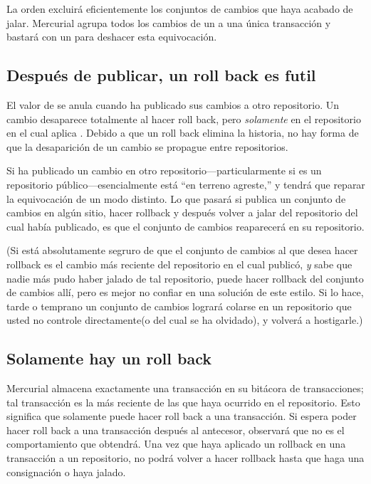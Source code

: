 La orden  excluirá eficientemente los conjuntos de
cambios que haya acabado de jalar.  Mercurial agrupa todos los cambios
de un  a una única transacción y bastará con un
 para deshacer esta equivocación.

\subsection{Después de publicar, un roll back es futil}
\label{sec:undo:rollback-after-push}

El valor de  se anula cuando ha publicado sus cambios
a otro repositorio.  Un cambio desaparece totalmente al hacer roll back,
pero \emph{solamente} en el repositorio en el cual aplica
.  Debido a que un roll back elimina la historia,
no hay forma de que la desaparición de un cambio se propague entre
repositorios.

Si ha publicado un cambio en otro repositorio---particularmente si es
un repositorio público---esencialmente está ``en terreno agreste,''
y tendrá que reparar la equivocación de un modo distinto.  Lo que
pasará si publica un conjunto de cambios en algún sitio, hacer
rollback y después volver a jalar del repositorio del cual había
publicado, es que el conjunto de cambios reaparecerá en su repositorio.

(Si está absolutamente segruro de que el conjunto de cambios al que
desea hacer rollback es el cambio más reciente del repositorio en el
cual publicó, \emph{y} sabe que nadie más pudo haber jalado de tal
repositorio, puede hacer rollback del conjunto de cambios allí, pero
es mejor no confiar en una solución de este estilo.  Si lo hace, tarde
o temprano un conjunto de cambios logrará colarse en un repositorio
que usted no controle directamente(o del cual se ha olvidado), y
volverá a hostigarle.)

\subsection{Solamente hay un roll back}

Mercurial almacena exactamente una transacción en su bitácora de
transacciones; tal transacción es la más reciente de las que haya
ocurrido en el repositorio. Esto significa que solamente puede hacer
roll back a una transacción. Si espera poder hacer roll back a una
transacción después al antecesor, observará que no es el
comportamiento que obtendrá.
Una vez que haya aplicado un rollback en una transacción a un
repositorio, no podrá volver a hacer rollback hasta que haga una
consignación o haya jalado.

